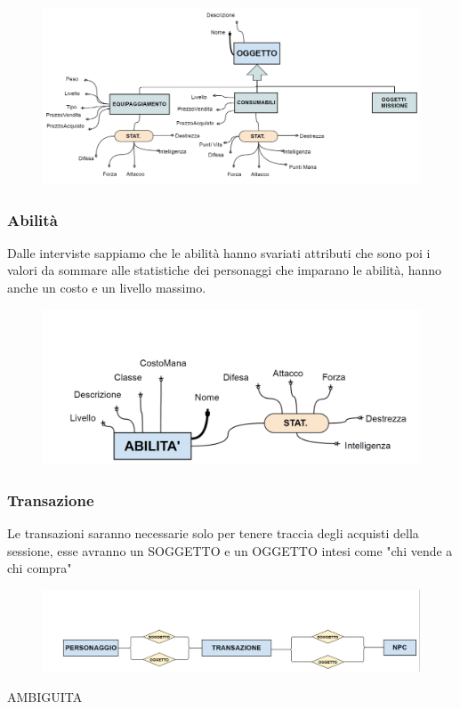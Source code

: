 \begin{figure}[H]
\centering
\includegraphics[width=0.7\linewidth]{./immagini/oggettodef.png}
\end{figure}

 \newpage
 
\subsubsection{Abilità} 
Dalle interviste sappiamo che le abilità hanno svariati attributi che sono poi i valori da sommare alle statistiche dei personaggi che imparano le abilità, hanno anche un costo e un livello massimo.

\begin{figure}[H]
\centering
\includegraphics[width=0.7\linewidth]{./immagini/ABILITADEF.png}
\end{figure}

\subsubsection{Transazione} 
Le transazioni saranno necessarie solo per tenere traccia degli acquisti della sessione, esse avranno un SOGGETTO e un OGGETTO intesi come "chi vende a chi compra"

\begin{figure}[H]
\centering
\includegraphics[width=0.7\linewidth]{./immagini/TRANSAZ.png}
\end{figure}
AMBIGUITA

